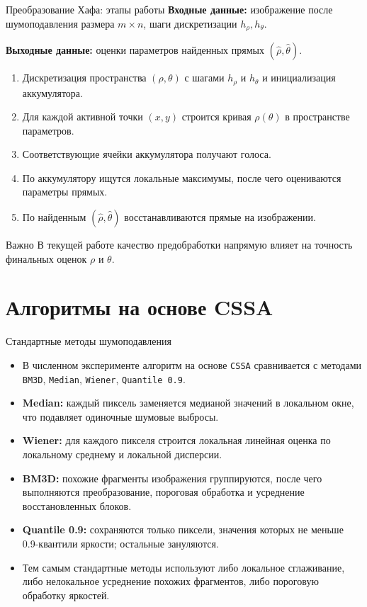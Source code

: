 \documentclass[unicode,notheorems]{beamer}
\begin{document}
\begin{frame}[shrink=5]{Преобразование Хафа: этапы работы}
	\textbf{Входные данные:} изображение после шумоподавления размера $m \times n$, шаги дискретизации $h_{\rho}, h_{\theta}$.

	\vspace{0.1cm}
	\textbf{Выходные данные:} оценки параметров найденных прямых $(\hat{\rho},\hat{\theta})$.

	\vspace{0.2cm}
	\begin{enumerate}
		\item Дискретизация пространства $(\rho,\theta)$ с шагами $h_\rho$ и $h_\theta$ и инициализация аккумулятора.
		\item Для каждой активной точки $(x,y)$ строится кривая $\rho(\theta)$ в пространстве параметров.
		\item Соответствующие ячейки аккумулятора получают голоса.
		\item По аккумулятору ищутся локальные максимумы, после чего оцениваются параметры прямых.
		\item По найденным $(\hat{\rho},\hat{\theta})$ восстанавливаются прямые на изображении.
	\end{enumerate}

	\vspace{0.2cm}
	\begin{block}{Важно}
		В текущей работе качество предобработки напрямую влияет на точность финальных оценок $\rho$ и $\theta$.
	\end{block}
\end{frame}

\section{Алгоритмы на основе CSSA}

\begin{frame}{Стандартные методы шумоподавления}
	\small
	\begin{itemize}
		\item В численном эксперименте алгоритм на основе \texttt{CSSA} сравнивается с методами \texttt{BM3D}, \texttt{Median}, \texttt{Wiener}, \texttt{Quantile 0.9}.
		\item \textbf{Median:} каждый пиксель заменяется медианой значений в локальном окне, что подавляет одиночные шумовые выбросы.
		\item \textbf{Wiener:} для каждого пикселя строится локальная линейная оценка по локальному среднему и локальной дисперсии.
		\item \textbf{BM3D:} похожие фрагменты изображения группируются, после чего выполняются преобразование, пороговая обработка и усреднение восстановленных блоков.
		\item \textbf{Quantile 0.9:} сохраняются только пиксели, значения которых не меньше 0.9-квантили яркости; остальные зануляются.
		\item Тем самым стандартные методы используют либо локальное сглаживание, либо нелокальное усреднение похожих фрагментов, либо пороговую обработку яркостей.
	\end{itemize}
\end{frame}
\end{document}
